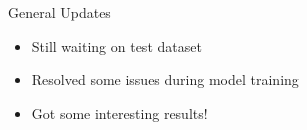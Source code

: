 \begin{frame}{General Updates}
    \begin{itemize}
        \item Still waiting on test dataset
        \item Resolved some issues during model training
        \item Got some interesting results!
    \end{itemize}    
\end{frame}






